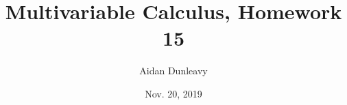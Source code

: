 \documentclass[12pt]{amsart}
\theoremstyle{plain}
\theoremstyle{definition}
\begin{document}
\doublespacing
\title{Multivariable Calculus, Homework 15}

\author{Aidan Dunleavy}

\date{Nov. 20, 2019}

\maketitle
\end{document}
